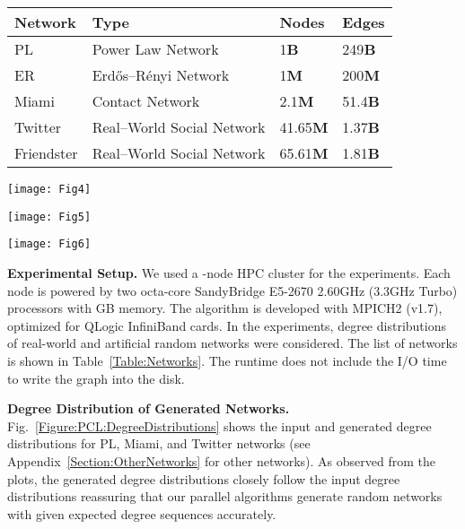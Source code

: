 \documentclass[conference,letterpaper,10pt]{IEEEtran}
\newcommand{\Figure}{Fig.\xspace}
\begin{document}
\begin{table*}[t]
\caption{Networks used in the experiments}
\label{Table:Networks}
\centering
\begin{tabular}{|l|l|l|l|}
\hline
Network  & Type & Nodes & Edges \\ 
\hline
PL & Power Law Network &  1\textbf{B} & 249\textbf{B}\\
ER &  Erd\H{o}s--R\'enyi Network &  1\textbf{M} & 200\textbf{M}\\
Miami \cite{Barrett2009} &  Contact Network &  2.1\textbf{M} & 51.4\textbf{B}\\
Twitter \cite{Yang2011} &  Real--World Social Network &  41.65\textbf{M} & 1.37\textbf{B}\\
Friendster \cite{Yang2012} &  Real--World Social Network &  65.61\textbf{M} & 1.81\textbf{B}\\
\hline
\end{tabular}
\end{table*}

\begin{figure*}[t]
\centering
{\texttt{[image: Fig4]}}
\caption{Degree distributions of input and generated degree sequences}
\label{Figure:PCL:DegreeDistributions}
\end{figure*}

\begin{figure*}[t]
\centering
{\texttt{[image: Fig5]}}
\caption{Comparison of partitioning schemes}
\label{Figure:PCL:PartitioningSchemes}
\end{figure*}

\begin{figure*}[t]
\centering
{\texttt{[image: Fig6]}}
\caption{Strong and weak scaling of the parallel algorithms}
\label{Figure:PCL:cl-strongscaling}
\end{figure*}

\textbf{Experimental Setup.}
We used a -node  HPC cluster for the experiments. Each node is powered by two octa-core  SandyBridge E5-2670 2.60GHz (3.3GHz Turbo) processors with  GB memory. The algorithm is developed with MPICH2 (v1.7), optimized for QLogic InfiniBand cards. In the experiments, degree distributions of real-world and artificial random networks were considered. The list of networks is shown in Table~\ref{Table:Networks}. The runtime does not include the I/O time to write the graph into the disk.

\textbf{Degree Distribution of Generated Networks.}
\Figure~\ref{Figure:PCL:DegreeDistributions} shows the input and generated  degree distributions for PL, Miami, and Twitter networks (see Appendix~\ref{Section:OtherNetworks} for other networks).  As observed from the plots, the generated degree distributions closely follow the input degree distributions reassuring that our parallel algorithms generate random networks with given expected degree sequences accurately.
\end{document}
